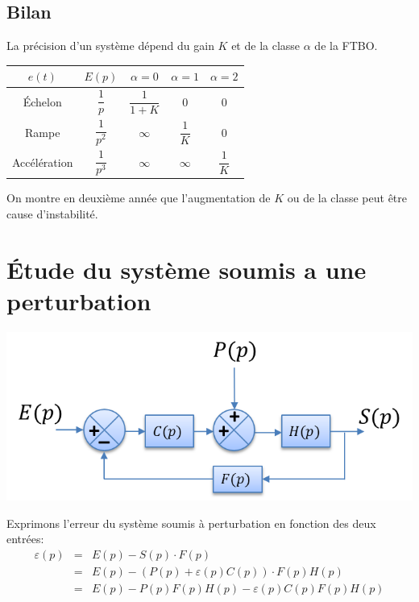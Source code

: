 \documentclass[10pt,oneside]{article}
\begin{document}
\subsection{Bilan}

\begin{resultat}
La précision d'un système dépend du gain $K$ et de la classe $\alpha$ de la FTBO. 
\begin{center}
\begin{tabular}{|c|c|c|c|c|}
\hline
$e(t)$ & $E(p)$ & $\alpha=0$ & $\alpha=1 $ & $\alpha=2$ \\
\hline
Échelon & $\dfrac{1}{p}$ & $\dfrac{1}{1+K}$ & 0 & 0 \\
\hline
Rampe & $\dfrac{1}{p^2}$ & $\infty$ & $\dfrac{1}{K}$ & 0 \\
\hline
Accélération & $\dfrac{1}{p^3}$ & $\infty$ & $\infty$ & $\dfrac{1}{K}$ \\
\hline
\end{tabular}
\end{center}
\end{resultat}

\begin{rem}
On montre en deuxième année que l'augmentation de $K$ ou de la classe peut être cause d'instabilité.
\end{rem}


\section{Étude du système soumis a une perturbation}
\begin{center}
\includegraphics[width=.5\textwidth]{png/bloc1.png}
\end{center}

Exprimons l'erreur du système soumis à perturbation en fonction des deux entrées:
\begin{eqnarray*}
\varepsilon(p) 
&=& E(p)-S(p)\cdot F(p) \\
&=& E(p)-\left(P(p)+\varepsilon(p)C(p)\right)\cdot F(p)H(p) \\
&=& E(p)-P(p)F(p)H(p)-\varepsilon(p)C(p)F(p)H(p) \\
\end{eqnarray*}
\end{document}
